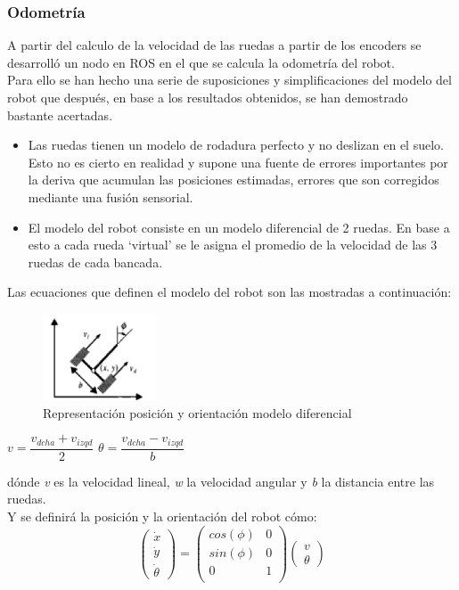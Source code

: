 \subsubsection{Odometría}
A partir del calculo de la velocidad de las ruedas a partir de los encoders se desarrolló un nodo en ROS en el que se calcula la odometría del robot.\\
Para ello se han hecho una serie de suposiciones y simplificaciones del modelo del robot que después, en base a los resultados obtenidos, se han demostrado bastante acertadas.
\begin{itemize}
    \item Las ruedas tienen un modelo de rodadura perfecto y no deslizan en el suelo. Esto no es cierto en realidad y supone una fuente de errores importantes por la deriva que acumulan las posiciones estimadas, errores que son corregidos mediante una fusión sensorial.
    \item El modelo del robot consiste en un modelo diferencial de 2 ruedas. En base a esto a cada rueda `virtual' se le asigna el promedio de la velocidad de las 3 ruedas de cada bancada.
\end{itemize}
Las ecuaciones que definen el modelo del robot son las mostradas a continuación:
\begin{figure}[!ht]
    \centering
    \includegraphics[width=0.3\textwidth]{images/dif_model}
    \caption{Representación posición y orientación modelo diferencial}
\end{figure}
\begin{center}
    $v=\dfrac{v_{dcha}+v_{izqd}}{2}$ \hspace{2cm} $\theta=\dfrac{v_{dcha}-v_{izqd}}{b}$
\end{center}
dónde \textit{v} es la velocidad lineal, \textit{w} la velocidad angular y \textit{b} la distancia entre las ruedas.\\
Y se definirá la posición y la orientación del robot cómo:
\begin{equation}
    \begin{pmatrix}
        \dot{x} \\
        \dot{y} \\
        \dot{\theta}
    \end{pmatrix}=
    \begin{pmatrix}
        cos(\phi) & 0 \\
        sin(\phi) & 0 \\
        0 & 1 \\
    \end{pmatrix}
    \begin{pmatrix}
        v \\
        \theta
    \end{pmatrix}
\end{equation}
